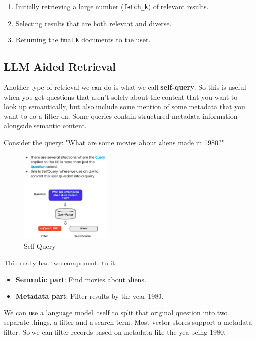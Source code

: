 \documentclass{article}
\begin{document}
\begin{enumerate}
    \item Initially retrieving a large number (\texttt{fetch\_k}) of relevant results.
    \item Selecting results that are both relevant and diverse.
    \item Returning the final \texttt{k} documents to the user.
\end{enumerate}

\subsection{LLM Aided Retrieval}

Another type of retrieval we can do is what we call \textbf{self-query}. So this is useful when you get questions that aren't solely about the content that you want to look up semantically, but also include some mention of some metadata that you want to do a filter on. Some queries contain structured metadata information alongside semantic content.

Consider the query: "What are some movies about aliens made in 1980?"

\begin{figure}[H]
    \centering
    \includegraphics[width=0.4\textwidth]{images/langchain_chat_with_your_data_015.png}
    \caption{Self-Query}
    \label{fig:self_query}
\end{figure}

This really has two components to it:

\begin{itemize}
    \item \textbf{Semantic part}: Find movies about aliens.
    \item \textbf{Metadata part}: Filter results by the year 1980.
\end{itemize}

We can use a language model itself to split that original question into two separate things, a filter and a search term. Most vector stores support a metadata filter. So we can filter records based on metadata like the yea being 1980. 
\end{document}
